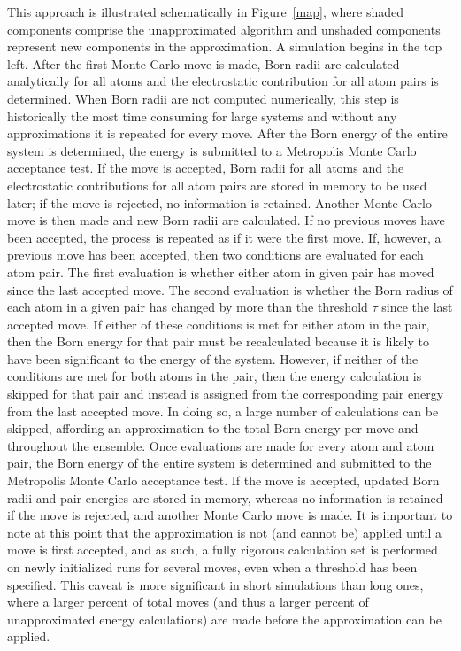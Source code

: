 \documentclass[12pt]{report}
\def\figlab{Figure}\def\figslab{\figlab s}
\newcommand*\fig[1]{\figlab~\ref{#1}}
\begin{document}
This approach is illustrated schematically in \fig{map}, where shaded components comprise the unapproximated algorithm and unshaded components represent new components in the approximation. A simulation begins in the top left. After the first Monte Carlo move is made, Born radii are calculated analytically for all atoms and the electrostatic contribution for all atom pairs is determined. When Born radii are not computed numerically, this step is historically the most time consuming for large systems and without any approximations it is repeated for every move. After the Born energy of the entire system is determined, the energy is submitted to a Metropolis Monte Carlo acceptance test. If the move is accepted, Born radii for all atoms and the electrostatic contributions for all atom pairs are stored in memory to be used later; if the move is rejected, no information is retained. Another Monte Carlo move is then made and new Born radii are calculated. If no previous moves have been accepted, the process is repeated as if it were the first move. If, however, a previous move has been accepted, then two conditions are evaluated for each atom pair. The first evaluation is whether either atom in given pair has moved since the last accepted move. The second evaluation is whether the Born radius of each atom in a given pair has changed by more than the threshold $\tau$ since the last accepted move. If either of these conditions is met for either atom in the pair, then the Born energy for that pair must be recalculated because it is likely to have been significant to the energy of the system. However, if neither of the conditions are met for both atoms in the pair, then the energy calculation is skipped for that pair and instead is assigned from the corresponding pair energy from the last accepted move. In doing so, a large number of calculations can be skipped, affording an approximation to the total Born energy per move and throughout the ensemble. Once evaluations are made for every atom and atom pair, the Born energy of the entire system is determined and submitted to the Metropolis Monte Carlo acceptance test. If the move is accepted, updated Born radii and pair energies are stored in memory, whereas no information is retained if the move is rejected, and another Monte Carlo move is made. It is important to note at this point that the approximation is not (and cannot be) applied until a move is first accepted, and as such, a fully rigorous calculation set is performed on newly initialized runs for several moves, even when a threshold has been specified. This caveat is more significant in short simulations than long ones, where a larger percent of total moves (and thus a larger percent of unapproximated energy calculations) are made before the approximation can be applied.
\end{document}

